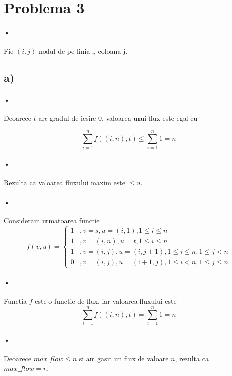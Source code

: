 \documentclass[paper=a4, fontsize=11pt]{scrartcl}
\begin{document}
\newpage
\section*{Problema 3}

\paragraph{•}
Fie $(i, j)$ nodul de pe linia i, coloana j.

\subsection*{a)}
\paragraph{•}
Deoarece $t$ are gradul de iesire 0, valoarea unui flux este egal cu

\[ \sum_{i=1}^{n} f((i,n),t) \leq \sum_{i=1}^{n} 1 = n \]

\paragraph{•}
Rezulta ca valoarea fluxului maxim este $\leq n$.

\paragraph{•}
Consideram urmatoarea functie
\[ f(v,u)=\left\{\begin{array}{ll}
	1    &,v=s,u=(i,1), 1\leq i\leq n \\
	1    &,v=(i,n),u=t, 1\leq i\leq n \\
	1    &,v=(i,j),u=(i,j+1), 1\leq i\leq n, 1\leq j < n \\
	0    &,v=(i,j),u=(i+1,j), 1\leq i < n, 1\leq j \leq n
\end{array}\right. \]

\paragraph{•}
Functia $f$ este o functie de flux, iar valoarea fluxului este
\[ \sum_{i=1}^{n} f((i,n),t) = \sum_{i=1}^{n} 1 = n \]

\paragraph{•}
Deoarece $max\_flow \leq n$ si am gasit un flux de valoare $n$, rezulta ca $max\_flow = n$.
\end{document}
